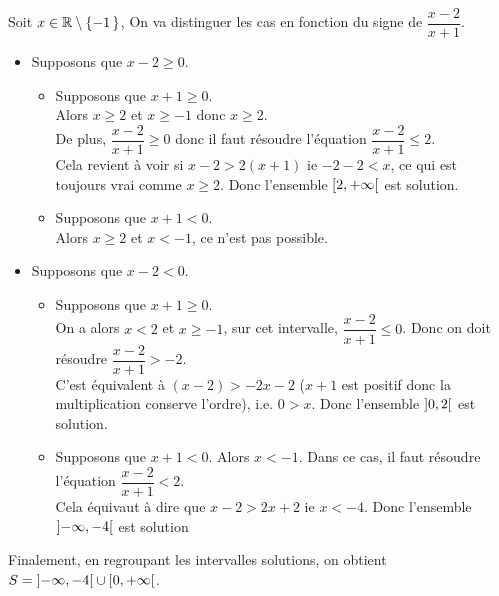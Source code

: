 \documentclass[mathmodern,openany,11pt]{livre}
\begin{document}
\begin{solution}
Soit $x \in \setRealNumbers \setminus \set{-1}$,
On va distinguer les cas en fonction du signe de $\dfrac{x-2}{x+1}$.
\begin{itemize}
\item Supposons que $x-2 \ge 0$.
\begin{itemize}
\item Supposons que $x+1 \ge 0$.\\
Alors $x \ge 2$ et $x \ge -1$ donc $x \ge 2$.\\
De plus, $\dfrac{x-2}{x+1} \ge 0$ donc il faut résoudre l'équation $\dfrac{x-2}{x+1} \le 2$.\\
Cela revient à voir si $x-2 > 2(x+1)$ ie $-2-2 < x$, ce qui est toujours vrai comme $x \ge 2$. Donc l'ensemble $\left[ 2 , +\infty \right[$ est solution.
\item Supposons que $x+1 < 0$.\\
Alors $x \ge 2$ et $x < -1$, ce n'est pas possible.
\end{itemize}
\item Supposons que $x-2 < 0$.
\begin{itemize}
\item Supposons que $x+1 \ge 0$.\\
On a alors $x < 2$ et $x \ge -1$, sur cet intervalle, $\dfrac{x-2}{x+1} \le 0$.
Donc on doit résoudre $\dfrac{x-2}{x+1} > -2$. \\
C'est équivalent à $(x-2) > -2x - 2$ ($x+1$ est positif donc la multiplication conserve l'ordre), i.e. $0 >x$. Donc l'ensemble $\left] 0 , 2 \right[$  est solution.
\item Supposons que $x+1 < 0$.
Alors $x < -1$. Dans ce cas, il faut résoudre l'équation $\dfrac{x-2}{x+1} < 2$.\\
Cela équivaut à dire que $x - 2 > 2x + 2$ ie $x < -4$. Donc l'ensemble $\left] -\infty , -4 \right[$ est solution
\end{itemize}
\end{itemize}
 
Finalement, en regroupant les intervalles solutions, on obtient $S = \left] -\infty , -4 \right[ \cup \left[ 0 , +\infty \right[$.
\end{solution}
\end{document}
